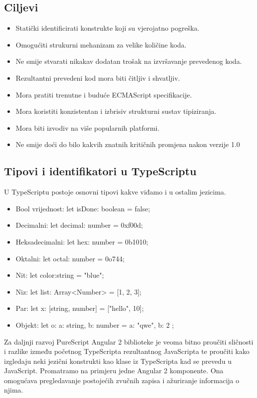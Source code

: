 \documentclass[times, utf8, zavrsni]{fer}
\begin{document}
\subsection{Ciljevi}
\begin{itemize}
\item Statički identificirati konstrukte koji su vjerojatno pogreška.
\item Omogućiti strukurni mehanizam za velike količine koda.
\item Ne smije stvarati nikakav dodatan trošak na izvršavanje prevedenog koda.
\item Rezultantni prevedeni kod mora biti čitljiv i shvatljiv.
\item Mora pratiti trenutne i buduće ECMAScript specifikacije.
\item Mora koristiti konzistentan i izbrisiv strukturni sustav tipiziranja.
\item Mora biti izvodiv na više popularnih platformi.
\item Ne smije doći do bilo kakvih znatnih kritičnih promjena nakon verzije 1.0
\end{itemize}

\subsection{Tipovi i identifikatori u TypeScriptu}
U TypeScriptu postoje osnovni tipovi kakve viđamo i u ostalim jezicima.
\begin{itemize}
\item Bool vrijednost: let isDone: boolean = false;
\item Decimalni: let decimal: number = 0xf00d;
\item Heksadecimalni: let hex: number = 0b1010;
\item Oktalni: let octal: number = 0o744;
\item Nit: let color:string = "blue";
\item Niz: let list: Array<Number> = [1, 2, 3];
\item Par: let x: [string, number] = ["hello", 10];
\item Objekt: let o: { a: string, b: number } = { a: "qwe", b: 2 };
\end{itemize}

Za daljnji razvoj PureScript Angular 2 biblioteke je veoma bitno proučiti sličnosti i razlike između početnog TypeScripta rezultantnog JavaScripta te proučiti kako izgledaju neki jezični konstrukti kao klase iz TypeScripta kad se prevedu u JavaScript. Promatramo na primjeru jedne Angular 2 komponente. Ona omogućava pregledavanje postojećih zvučnih zapisa i ažuriranje informacija o njima.
\end{document}
